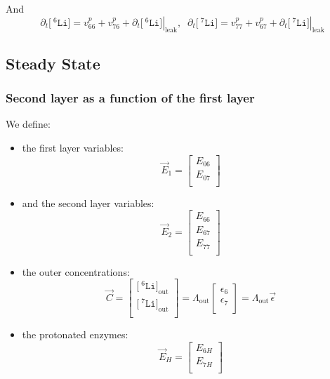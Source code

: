 \documentclass[aps,onecolumn,11pt]{revtex4}
\newcommand{\mychem}[1]{\mathtt{#1}}
\newcommand{\myconc}[1]{\big[#1\big]}
\newcommand{\spLi}[1]{{\!~^{#1}\mychem{Li}}}
\newcommand{\Li}[1]{\myconc{\spLi{#1}}}
\newcommand{\myleak}[1]{\left.{#1}\right\vert_{\mathrm{leak}}}
\newcommand{\myout}[1]{{#1}_{\mathrm{out}}}
\newcommand{\LiOut}[1]{\myout{\Li{#1}}}
\newcommand{\LiAll}{\Lambda}
\newcommand{\LiAllOut}{\myout{\LiAll}}
\begin{document}
And
\begin{equation}
	\partial_t \Li{6} = v^p_{66}+v^p_{76} + \partial_t \myleak{\Li{6}},\;\;
	\partial_t \Li{7} = v^p_{77}+v^p_{67} + \partial_t \myleak{\Li{7}}
\end{equation}

\subsection{Steady State}


\subsubsection{Second layer as a function of the first layer}

We define:
\begin{itemize}
\item the first layer variables:
\begin{equation}
	\vec{E}_1 = \begin{bmatrix}
	E_{06}\\
	E_{07}\\
	\end{bmatrix}
\end{equation}
\item and the second layer variables:
\begin{equation}
	\vec{E}_2 = \begin{bmatrix}
	E_{66}\\
	E_{67}\\
	E_{77}\\
	\end{bmatrix}
\end{equation}
\item the outer concentrations:
\begin{equation}
	\vec{C} = 
	\begin{bmatrix}
	\LiOut{6}\\
	\LiOut{7}\\
	\end{bmatrix}
	=
	\LiAllOut
	\begin{bmatrix}
	\epsilon_6\\
	\epsilon_7\\
	\end{bmatrix}
	=
	\LiAllOut\vec{\epsilon}
\end{equation}
\item the protonated enzymes:
\begin{equation}
	\vec{E}_H = 
	\begin{bmatrix}
	E_{6H}\\
	E_{7H}\\
	\end{bmatrix}
\end{equation}

\end{itemize}
\end{document}
